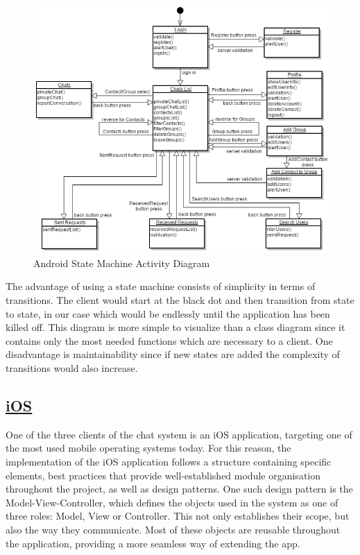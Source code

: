 \documentclass{article}
\begin{document}
	\begin{figure}[H]
		\centering
		\includegraphics[scale=0.7]{androidActivity.png}
		\caption{Android State Machine Activity Diagram}
	\end{figure}

	The advantage of using a state machine consists of simplicity in terms of transitions. The client would start at the black dot and then transition from state to state, in our case which would be endlessly until the application has been killed off. This diagram is more simple to visualize than a class diagram since it contains only the most needed functions which are necessary to a client. One disadvantage is maintainability since if new states are added the complexity of transitions would also increase.
	
	\newpage
	\subsection{\underline{\textbf{iOS}}}
	One of the three clients of the chat system is an iOS application, targeting one of the most used mobile operating systems today. For this reason, the implementation of the iOS application follows a structure containing specific elements, best practices that provide well-established module organisation throughout the project, as well as design patterns. One such design pattern is the Model-View-Controller, which defines the objects used in the system as one of three roles: Model, View or Controller. This not only establishes their scope, but also the way they communicate. Most of these objects are reusable throughout the application, providing a more seamless way of extending the app.
	
\end{document}
